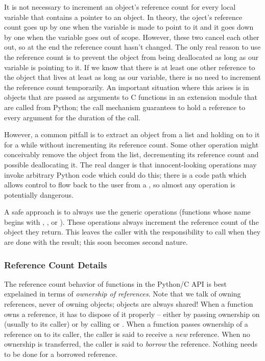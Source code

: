 It is not necessary to increment an object's reference count for every 
local variable that contains a pointer to an object.  In theory, the 
oject's reference count goes up by one when the variable is made to 
point to it and it goes down by one when the variable goes out of 
scope.  However, these two cancel each other out, so at the end the 
reference count hasn't changed.  The only real reason to use the 
reference count is to prevent the object from being deallocated as 
long as our variable is pointing to it.  If we know that there is at 
least one other reference to the object that lives at least as long as 
our variable, there is no need to increment the reference count 
temporarily.  An important situation where this arises is in objects 
that are passed as arguments to C functions in an extension module 
that are called from Python; the call mechanism guarantees to hold a 
reference to every argument for the duration of the call.

However, a common pitfall is to extract an object from a list and 
holding on to it for a while without incrementing its reference count.  
Some other operation might conceivably remove the object from the 
list, decrementing its reference count and possible deallocating it.  
The real danger is that innocent-looking operations may invoke 
arbitrary Python code which could do this; there is a code path which 
allows control to flow back to the user from a , so 
almost any operation is potentially dangerous.

A safe approach is to always use the generic operations (functions 
whose name begins with , , 
 or ).  These operations always 
increment the reference count of the object they return.  This leaves 
the caller with the responsibility to call  when 
they are done with the result; this soon becomes second nature.

\subsubsection{Reference Count Details}

The reference count behavior of functions in the Python/C API is best 
expelained in terms of \emph{ownership of references}.  Note that we 
talk of owning references, never of owning objects; objects are always 
shared!  When a function owns a reference, it has to dispose of it 
properly -- either by passing ownership on (usually to its caller) or 
by calling  or .  When a function 
passes ownership of a reference on to its caller, the caller is said 
to receive a \emph{new} reference.  When no ownership is transferred, 
the caller is said to \emph{borrow} the reference.  Nothing needs to 
be done for a borrowed reference.

